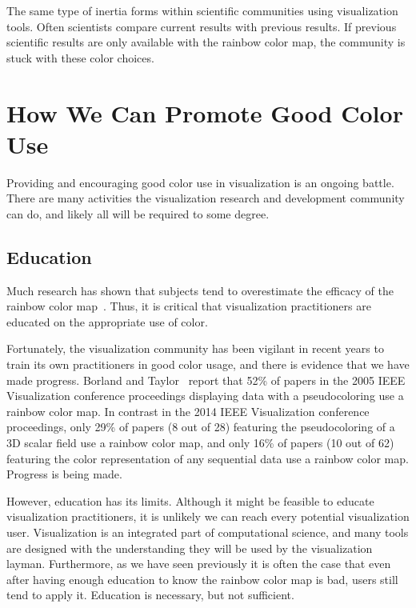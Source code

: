 \documentclass[letterpaper,twocolumn,fleqn]{article}
\newcommand*{\lcite}[1]{~\cite{#1}}
\newcommand*{\scite}[1]{~\cite{#1}}
\newcommand{\fix}[1]{}
\begin{document}
The same type of inertia forms within scientific communities using
visualization tools. Often scientists compare current results with previous
results. If previous scientific results are only available with the rainbow
color map, the community is stuck with these color choices.


\section{How We Can Promote Good Color Use}

\noindent
Providing and encouraging good color use in visualization is an ongoing
battle. There are many activities the visualization research and
development community can do, and likely all will be required to some
degree.

\subsection{Education}

\noindent
Much research has shown that subjects tend to overestimate the efficacy of
the rainbow color map\lcite{Borkin2011}\fix{overestimate ref}. Thus, it is critical
that visualization practitioners are educated on the appropriate use of
color.

Fortunately, the visualization community has been vigilant in recent years
to train its own practitioners in good color usage, and there is evidence
that we have made progress. Borland and Taylor\scite{Borland2007} report
that 52\% of papers in the 2005 IEEE Visualization conference proceedings
displaying data with a pseudocoloring use a rainbow color map. In contrast
in the 2014 IEEE Visualization conference proceedings, only 29\% of papers
(8 out of 28) featuring the pseudocoloring of a 3D scalar field use a
rainbow color map, and only 16\% of papers (10 out of 62) featuring the color
representation of any sequential data use a rainbow color map. Progress is
being made.

However, education has its limits. Although it might be feasible to educate
visualization practitioners, it is unlikely we can reach every potential
visualization user. Visualization is an integrated part of computational
science, and many tools are designed with the understanding they will be
used by the visualization layman. Furthermore, as we have seen previously
it is often the case that even after having enough education to know the
rainbow color map is bad, users still tend to apply it. Education is
necessary, but not sufficient.
\end{document}
